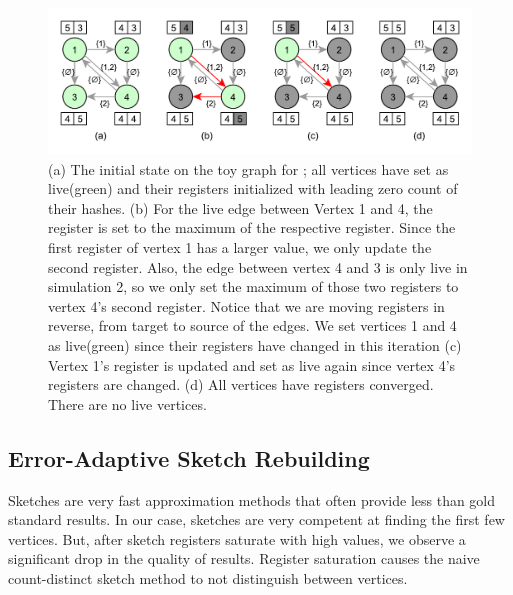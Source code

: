\documentclass[10pt,journal,compsoc]{IEEEtran}
\newcommand\acro{{\sc{HyperFuseR\xspace}\xspace}\xspace}
\begin{document}
\begin{figure}[!ht]
    \begin{center}
    \includegraphics[width=0.7\linewidth]{images/sketch-diffusion.pdf}
    \caption{(a) The initial state on the toy graph for \acro{}; all vertices have set as live(green) and their registers initialized with leading zero count of their hashes. (b) 
    For the live edge between Vertex 1 and 4, the register is set to the maximum of the respective register. Since the first register of vertex 1 has a larger value, we only update the second register. Also, the edge between vertex 4 and 3 is only live in simulation 2, so we only set the maximum of those two registers to vertex 4's second register. Notice that we are moving registers in reverse, from target to source of the edges. We set vertices 1 and 4 as live(green) since their registers have changed in this iteration (c) Vertex 1's register is updated and set as live again since vertex 4's registers are changed.  (d) All vertices have registers converged. There are no live vertices. }\label{fig:hf-processing} 
    \end{center}
    \end{figure}
\subsection{Error-Adaptive Sketch Rebuilding}

Sketches are very fast approximation methods that often provide less than gold standard results. In our case, sketches are very competent at finding the first few vertices. But, after sketch registers saturate with high values, we observe a significant drop in the quality of results. Register saturation causes the naive count-distinct sketch method to not distinguish between vertices. 
\end{document}
